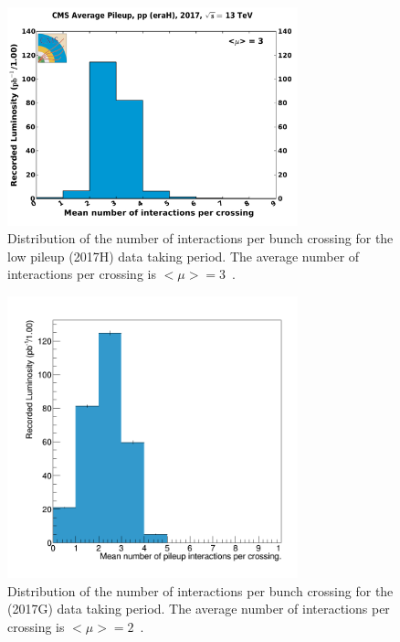 \begin{figure}[htbp]
\centering
  \includegraphics[width=0.75\textwidth]{plots/Data/pileup_pp_lowPU_2017.pdf}
  \caption{Distribution of the number of interactions per bunch crossing for the low pileup \sh (2017H) data taking period. The average number of interactions per crossing is $<\mu> = 3$~\cite{LumiCalibTwiki}.}
  \label{fig:data:lumiPU13}
\end{figure}

\begin{figure}[htbp]
\centering
  \includegraphics[width=0.75\textwidth]{plots/Data/pileup_5TeV.png}
  \caption{Distribution of the number of interactions per bunch crossing for the \sg (2017G) data taking period. The average number of interactions per crossing is $<\mu> = 2$~\cite{LumiCalibTwiki}.}
  \label{fig:data:lumiPU5}
\end{figure}